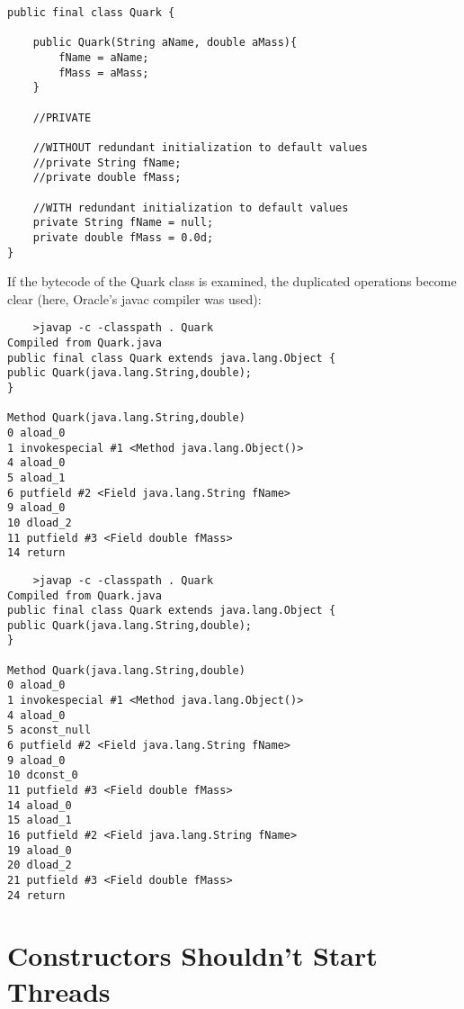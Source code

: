 \begin{verbatim}
public final class Quark {

    public Quark(String aName, double aMass){
        fName = aName;
        fMass = aMass;
    }

    //PRIVATE

    //WITHOUT redundant initialization to default values
    //private String fName;
    //private double fMass;

    //WITH redundant initialization to default values
    private String fName = null;
    private double fMass = 0.0d;
}
\end{verbatim}

If the bytecode of the Quark class is examined, the duplicated operations become clear (here, Oracle’s javac compiler was used):


\begin{tcolorbox}[
skin=bicolor,colframe=blue!70!black,fonttitle=\bfseries,
    colback=blue!20!white,colbacklower=green!20!white,left=0ex,right=0ex,
    sidebyside,
  title={Title in the first language},
  after title={\hfill Title in the second language},
  width=\linewidth*1
  ]
    \begin{lstlisting}
    >javap -c -classpath . Quark
Compiled from Quark.java
public final class Quark extends java.lang.Object {
public Quark(java.lang.String,double);
}

Method Quark(java.lang.String,double)
0 aload_0
1 invokespecial #1 <Method java.lang.Object()>
4 aload_0
5 aload_1
6 putfield #2 <Field java.lang.String fName>
9 aload_0
10 dload_2
11 putfield #3 <Field double fMass>
14 return
    \end{lstlisting}
    \tcblower

    \begin{lstlisting}
    >javap -c -classpath . Quark
Compiled from Quark.java
public final class Quark extends java.lang.Object {
public Quark(java.lang.String,double);
}

Method Quark(java.lang.String,double)
0 aload_0
1 invokespecial #1 <Method java.lang.Object()>
4 aload_0
5 aconst_null
6 putfield #2 <Field java.lang.String fName>
9 aload_0
10 dconst_0
11 putfield #3 <Field double fMass>
14 aload_0
15 aload_1
16 putfield #2 <Field java.lang.String fName>
19 aload_0
20 dload_2
21 putfield #3 <Field double fMass>
24 return
    \end{lstlisting}
\end{tcolorbox}

\section{Constructors Shouldn't Start Threads}

